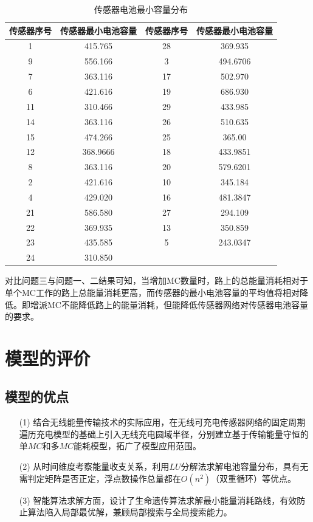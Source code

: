 \documentclass{whutmod}
\begin{document}
  		\begin{table}[H]
  	\centering		
  	\caption{传感器电池最小容量分布}\label{adfs}
  	\begin{tabular}{cccc}
  		\toprule[2pt]
  		\multicolumn{1}{m{2.5cm}}{\centering 传感器序号}
  		& \multicolumn{1}{m{4.5cm}}{\centering 传感器最小电池容量}& \multicolumn{1}{m{2.5cm}}{\centering 传感器序号}& \multicolumn{1}{m{4.5cm}}{\centering 传感器最小电池容量}
  		\\
  		\midrule[1pt]
  		1 &   415.765 & 28&369.935\\ 
  		9&   556.166& 3&494.6706\\ 
  		7&   363.116& 17&502.970\\ 
  		6 &   421.616& 19&686.930\\ 
  		11 &   310.466 & 29&433.985\\ 
  		14&   363.116& 26&510.635\\ 
  		15 &  474.266& 25&365.00\\ 
  		12&  368.9666& 18&433.9851\\ 
  		8&  363.116& 20&579.6201\\ 
  		2 &  421.616& 10&345.184\\ 
  		4&  429.020& 16&481.3847\\ 
  		21&  586.580& 27&294.109 \\ 
  		22 &  369.935& 13&350.859\\ 
  		23 & 435.585& 5&243.0347\\ 
  		24 & 310.850& &\\
  		\bottomrule[2pt]	
  	\end{tabular}
  \end{table}
  对比问题三与问题一、二结果可知，当增加MC数量时，路上的总能量消耗相对于单个MC工作的路上总能量消耗更高，而传感器的最小电池容量的平均值将相对降低。即增派MC不能降低路上的能量消耗，但能降低传感器网络对传感器电池容量的要求。
 
  	\section{模型的评价}
		\subsection{模型的优点}
			\begin{itemize}                                             
			\item [(1)]结合无线能量传输技术的实际应用，在无线可充电传感器网络的固定周期遍历充电模型的基础上引入无线充电圆域半径，分别建立基于传输能量守恒的单$MC$和多$MC$能耗模型，拓广了模型应用范围。
			\item [(2)]从时间维度考察能量收支关系，利用$LU$分解法求解电池容量分布，具有无需判定矩阵是否正定，浮点数操作总量都在$O(n^2)$（双重循环）等优点。 
			\item [(3)]智能算法求解方面，设计了生命遗传算法求解最小能量消耗路线，有效防止算法陷入局部最优解，兼顾局部搜索与全局搜索能力。
			\end{itemize}
\end{document}
